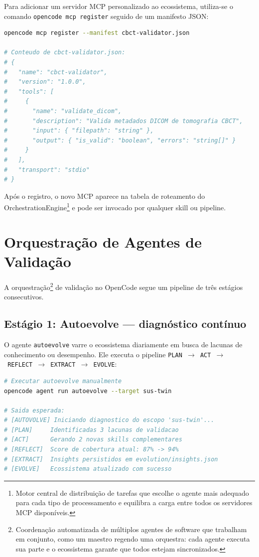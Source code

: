 Para adicionar um servidor MCP personalizado ao ecossistema, utiliza-se o
comando \texttt{opencode mcp register} seguido de um manifesto JSON:

\begin{lstlisting}[language=bash, caption={Registro de um novo MCP para validação
de segmentação CBCT}, label={lst:mcp-register}, style=bashstyle]
opencode mcp register --manifest cbct-validator.json

# Conteudo de cbct-validator.json:
# {
#   "name": "cbct-validator",
#   "version": "1.0.0",
#   "tools": [
#     {
#       "name": "validate_dicom",
#       "description": "Valida metadados DICOM de tomografia CBCT",
#       "input": { "filepath": "string" },
#       "output": { "is_valid": "boolean", "errors": "string[]" }
#     }
#   ],
#   "transport": "stdio"
# }
\end{lstlisting}

Após o registro, o novo MCP aparece na tabela de roteamento do
OrchestrationEngine\footnote{Motor central de distribuição de tarefas que
escolhe o agente mais adequado para cada tipo de processamento e equilibra
a carga entre todos os servidores MCP disponíveis.} e pode ser invocado por
qualquer skill ou pipeline.


\section{Orquestração de Agentes de Validação}
\label{sec:opencode-orquestracao}

A orquestração\footnote{Coordenação automatizada de múltiplos agentes de
software que trabalham em conjunto, como um maestro regendo uma orquestra:
cada agente executa sua parte e o ecossistema garante que todos estejam
sincronizados.} de validação no OpenCode segue um pipeline de três estágios
consecutivos.

\subsection{Estágio 1: Autoevolve — diagnóstico contínuo}

O agente \texttt{autoevolve} varre o ecossistema diariamente em busca de
lacunas de conhecimento ou desempenho. Ele executa o pipeline
\texttt{PLAN~$\rightarrow$~ACT~$\rightarrow$~REFLECT~$\rightarrow$~EXTRACT~$\rightarrow$~EVOLVE}:

\begin{lstlisting}[language=bash, caption={Execução do agente Autoevolve para
diagnóstico do pipeline SUS-Twin}, label={lst:autoevolve}, style=bashstyle]
# Executar autoevolve manualmente
opencode agent run autoevolve --target sus-twin

# Saida esperada:
# [AUTOVOLVE] Iniciando diagnostico do escopo 'sus-twin'...
# [PLAN]     Identificadas 3 lacunas de validacao
# [ACT]      Gerando 2 novas skills complementares
# [REFLECT]  Score de cobertura atual: 87% -> 94%
# [EXTRACT]  Insights persistidos em evolution/insights.json
# [EVOLVE]   Ecossistema atualizado com sucesso
\end{lstlisting}

